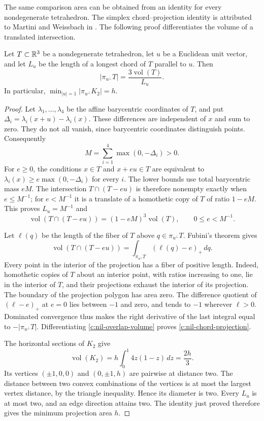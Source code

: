 The same comparison area can be obtained from an identity for every
nondegenerate tetrahedron.  The simplex chord--projection identity
is attributed to Martini and Weissbach in
\cite[p.~8268]{Heinrich2014}.  The following proof differentiates the
volume of a translated intersection.

\begin{lemma}\label{c:nil-projection}
Let $T\subset\mathbb R^3$ be a nondegenerate tetrahedron, let $u$ be a
Euclidean unit vector, and let $L_u$ be the length of a longest chord of $T$
parallel to $u$.  Then
\begin{equation}\label{c:nil-chord-projection}
 |\pi_{u^\perp}T|=\frac{3\operatorname{vol}(T)}{L_u}.
\end{equation}
In particular,
$\min_{|u|=1}|\pi_{u^\perp}K_2|=h$.
\end{lemma}

\begin{proof}
Let $\lambda_1,\ldots,\lambda_4$ be the affine barycentric
coordinates of $T$, and put
$\Delta_i=\lambda_i(x+u)-\lambda_i(x)$.
These differences are independent of $x$ and sum to zero.  They do
not all vanish, since barycentric coordinates distinguish points.
Consequently
\[
 M=\sum_{i=1}^4\max(0,-\Delta_i)>0.
\]
For $e\ge0$, the conditions $x\in T$ and $x+eu\in T$ are
equivalent to
$\lambda_i(x)\ge e\max(0,-\Delta_i)$ for every $i$.
The lower bounds use total barycentric mass $eM$.  The intersection
$T\cap(T-eu)$ is therefore nonempty exactly when $e\le M^{-1}$;
for $e<M^{-1}$ it is a translate of a homothetic copy of $T$ of
ratio $1-eM$.  This proves $L_u=M^{-1}$ and
\begin{equation}\label{c:nil-overlap-volume}
 \operatorname{vol}(T\cap(T-eu))
 =(1-eM)^3\operatorname{vol}(T),\qquad 0\le e<M^{-1}.
\end{equation}

Let $\ell(q)$ be the length of the fiber of $T$ above
$q\in\pi_{u^\perp}T$.  Fubini's theorem gives
\[
 \operatorname{vol}(T\cap(T-eu))
 =\int_{\pi_{u^\perp}T}(\ell(q)-e)_+\,dq.
\]
Every point in the interior of the projection has a fiber of positive
length.  Indeed, homothetic copies of $T$ about an interior point,
with ratios increasing to one, lie in the interior of $T$, and their
projections exhaust the interior of its projection.  The boundary
of the projection polygon has area zero.  The difference quotient
of $(\ell-e)_+$ at $e=0$ lies between $-1$ and zero, and tends to
$-1$ wherever $\ell>0$.  Dominated convergence thus makes the right
derivative of the last integral equal to $-|\pi_{u^\perp}T|$.
Differentiating \eqref{c:nil-overlap-volume} proves
\eqref{c:nil-chord-projection}.

The horizontal sections of $K_2$ give
\[
 \operatorname{vol}(K_2)
 =h\int_0^1 4z(1-z)\,dz=\frac{2h}{3}.
\]
Its vertices $(\pm1,0,0)$ and $(0,\pm1,h)$ are pairwise at
distance two.  The distance between two convex combinations of the
vertices is at most the largest vertex distance, by the triangle
inequality.  Hence its diameter is two.  Every $L_u$ is at most
two, and an edge direction attains two.  The identity just proved
therefore gives the minimum projection area $h$.
\end{proof}
